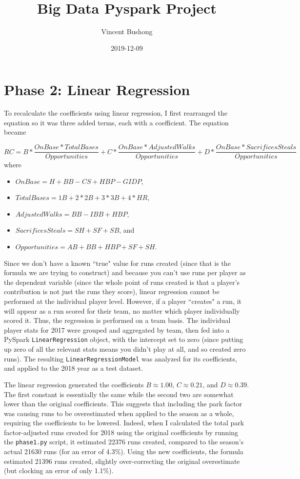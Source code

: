 \documentclass{article}
\title{Big Data Pyspark Project}
\date{2019-12-09}
\author{Vincent Bushong}
\begin{document}
	\maketitle
	
	\section{Phase 2: Linear Regression}
	To recalculate the coefficients using linear regression, I first rearranged the equation so it was three added terms, each with a coefficient. The equation became
	
	\begin{equation*}
	RC = B * \frac{OnBase * TotalBases}{Opportunities} + C * \frac{OnBase * AdjustedWalks}{Opportunities} + D * \frac{OnBase * SacrificesSteals}{Opportunities}
	\end{equation*}
	where
	\begin{itemize}
		\item $OnBase = H + BB - CS + HBP - GIDP$,
		\item $TotalBases = 1B + 2*2B + 3*3B + 4*HR$,
		\item $AdjustedWalks=BB - IBB + HBP$,
		\item $SacrificesSteals = SH + SF + SB$, and
		\item $Opportunities = AB + BB + HBP + SF + SH$.
	\end{itemize}

	Since we don't have a known ``true" value for runs created (since that is the formula we are trying to construct) and because you can't use runs per player as the dependent variable (since the whole point of runs created is that a player's contribution is not just the runs they score), linear regression cannot be performed at the individual player level. However, if a player ``creates" a run, it will appear as a run scored for their team, no matter which player individually scored it. Thus, the regression is performed on a team basis. The individual player stats for 2017 were grouped and aggregated by team, then fed into a PySpark \texttt{LinearRegression} object, with the intercept set to zero (since putting up zero of all the relevant stats means you didn't play at all, and so created zero runs). The resulting \texttt{LinearRegressionModel} was analyzed for its coefficients, and applied to the 2018 year as a test dataset.

	The linear regression generated the coefficients $B \approx 1.00$, $C \approx 0.21$, and $D \approx 0.39$. The first constant is essentially the same while the second two are somewhat lower than the original coefficients. This suggests that including the park factor was causing runs to be overestimated when applied to the season as a whole, requiring the coefficients to be lowered. Indeed, when I calculated the total park factor-adjusted runs created for 2018 using the original coefficients by running the \texttt{phase1.py} script, it estimated 22376 runs created, compared to the season's actual 21630 runs (for an error of 4.3\%). Using the new coefficients, the formula estimated 21396 runs created, slightly over-correcting the original overestimate (but clocking an error of only 1.1\%).
	
\end{document}

